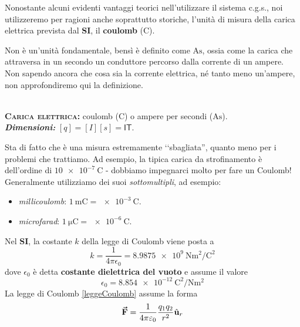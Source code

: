Nonostante alcuni evidenti vantaggi teorici nell'utilizzare il sistema c.g.s., noi utilizzeremo per ragioni anche soprattutto storiche, l'unità di misura della carica elettrica prevista dal \textbf{SI}, il \textbf{coulomb} ($\unit{\coulomb}$). %

Non è un'unità fondamentale, bensì è definito come $\unit{\ampere\second}$, ossia come la carica che attraversa in un secondo un conduttore percorso dalla corrente di un ampere. Non sapendo ancora che cosa sia la corrente elettrica, né tanto meno un'ampere, non approfondiremo qui la definizione.
\begin{units}~\\
	\textbf{\textsc{Carica elettrica:}} coulomb  ($\unit{\coulomb}$) o ampere per secondi ($\unit{\ampere\second}$).\\
	\textit{\textbf{Dimensioni:}} $[q]=[I][s]=\mathsf{I}\mathsf{T}$.
\end{units}
Sta di fatto che è una misura estremamente ‘‘sbagliata'', quanto meno per i problemi che trattiamo. Ad esempio, la tipica carica da strofinamento è dell'ordine di $\SI{10e-7}{\coulomb}$ - dobbiamo impegnarci molto per fare un Coulomb! Generalmente utilizziamo dei suoi \textit{sottomultipli}, ad esempio:
\begin{itemize}
	\item \textit{millicoulomb}: $\SI[per-mode = fraction,exponent-product=\ensuremath{\cdot}]{1}{\milli\coulomb}=\SI[per-mode = fraction,exponent-product=\ensuremath{\cdot}]{e-3}{\coulomb}$.
	\item \textit{microfarad}: $\SI[per-mode = fraction,exponent-product=\ensuremath{\cdot}]{1}{\micro\coulomb}=\SI[per-mode = fraction,exponent-product=\ensuremath{\cdot}]{e-6}{\coulomb}$.
\end{itemize}
Nel \textbf{SI}, la costante $k$ della legge di Coulomb viene posta a
\begin{equation}
	k=\frac{1}{4\pi\epsilon_0}=\SI[per-mode = fraction,exponent-product=\ensuremath{\cdot}]{8,9875e9}{\newton\square\metre\per\square\coulomb}
\end{equation}
dove $\epsilon_0$ è detta \textbf{costante dielettrica del vuoto} e assume il valore
\begin{equation}
	\epsilon_0=\SI[per-mode = fraction,exponent-product=\ensuremath{\cdot}]{8,854e-12}{\square\coulomb\per\newton\square\metre}
\end{equation}
La legge di Coulomb \ref{leggeCoulomb} assume la forma
\begin{equation}
\vb*{\va{F}}=\frac{1}{4\pi\varepsilon_0}\frac{q_1q_2}{r^2}\hat{\mathbf{u}}_r
\end{equation}
